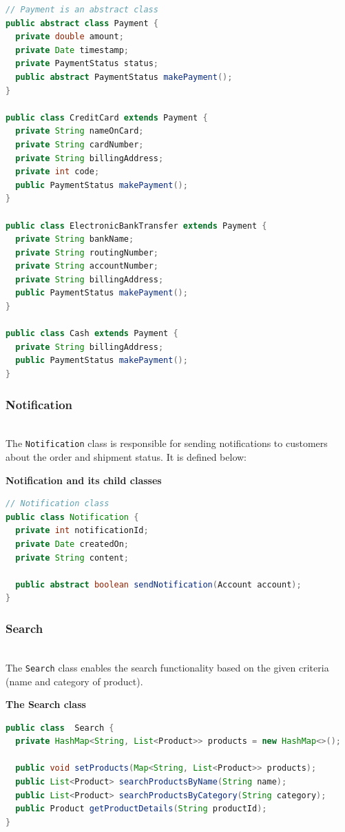 \begin{lstlisting}[language=Java]
// Payment is an abstract class
public abstract class Payment {
  private double amount;
  private Date timestamp;
  private PaymentStatus status;
  public abstract PaymentStatus makePayment();
}

public class CreditCard extends Payment {
  private String nameOnCard;
  private String cardNumber;
  private String billingAddress;
  private int code;
  public PaymentStatus makePayment();
}

public class ElectronicBankTransfer extends Payment {
  private String bankName;
  private String routingNumber; 
  private String accountNumber;
  private String billingAddress;
  public PaymentStatus makePayment();
}

public class Cash extends Payment {
  private String billingAddress;
  public PaymentStatus makePayment();
}
\end{lstlisting}

\subsubsection{Notification}\label{0ZVCay7W6Bkab1KXP_cLz}
\\
The \texttt{Notification} class is responsible for sending notifications to customers about the order and shipment status. It is defined below:

\textbf{Notification and its child classes}

\begin{lstlisting}[language=Java]
// Notification class
public class Notification {
  private int notificationId;
  private Date createdOn;
  private String content;

  public abstract boolean sendNotification(Account account);
}
\end{lstlisting}

\subsubsection{Search}\label{julu7b82zRwsJjYIajaE4}
\\
The \texttt{Search} class enables the search functionality based on the given criteria (name and category of product).

\textbf{The Search class}

\begin{lstlisting}[language=Java]
public class  Search {
  private HashMap<String, List<Product>> products = new HashMap<>();

  public void setProducts(Map<String, List<Product>> products);
  public List<Product> searchProductsByName(String name);
  public List<Product> searchProductsByCategory(String category);
  public Product getProductDetails(String productId);
}
\end{lstlisting}

